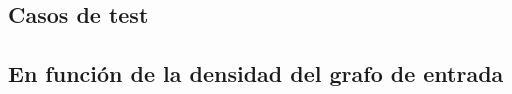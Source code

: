 \subsection{Casos de test}


\vspace{2em}
\subsection{En función de la densidad del grafo de entrada}


